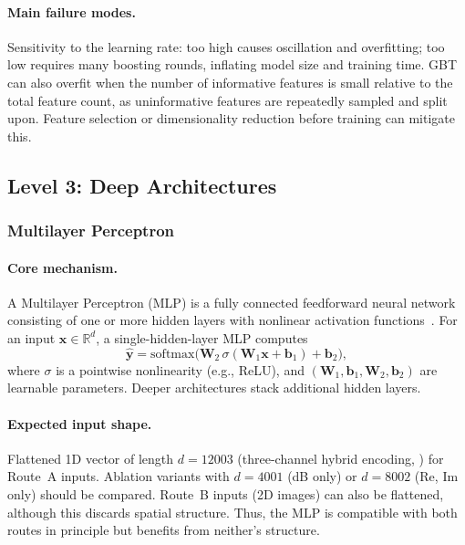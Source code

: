 \paragraph{Main failure modes.}
Sensitivity to the learning rate: too high causes oscillation and
overfitting; too low requires many boosting rounds, inflating model
size and training time.  GBT can also overfit when the number of
informative features is small relative to the total feature count,
as uninformative features are repeatedly sampled and split upon.
Feature selection or dimensionality reduction before training can
mitigate this.



\subsection{Level 3: Deep Architectures}\label{subsec:level3}
\subsubsection{Multilayer Perceptron}\label{subsec:mlp}

\paragraph{Core mechanism.}
A Multilayer Perceptron (MLP) is a fully connected feedforward neural
network consisting of one or more hidden layers with nonlinear
activation functions~\cite{haykin2009nn, goodfellow2016deep}.  For an
input $\mathbf{x} \in \mathbb{R}^d$, a single-hidden-layer MLP
computes
%
\begin{equation}
  \hat{\mathbf{y}}
  = \mathrm{softmax}\!\bigl(\mathbf{W}_2 \,
    \sigma(\mathbf{W}_1 \mathbf{x} + \mathbf{b}_1) + \mathbf{b}_2\bigr),
\end{equation}
%
where $\sigma$ is a pointwise nonlinearity (e.g., ReLU), and
$(\mathbf{W}_1, \mathbf{b}_1, \mathbf{W}_2, \mathbf{b}_2)$ are
learnable parameters.  Deeper architectures stack additional
hidden layers.

\paragraph{Expected input shape.}
Flattened 1D vector of length $d = 12003$ (three-channel hybrid encoding,
) for Route~A inputs.  Ablation variants with
$d = 4001$ (dB only) or $d = 8002$ (Re, Im only) should be compared.
Route~B inputs (2D images) can also be flattened, although this discards
spatial structure.  Thus, the MLP is compatible with both routes in
principle but benefits from neither's structure.

